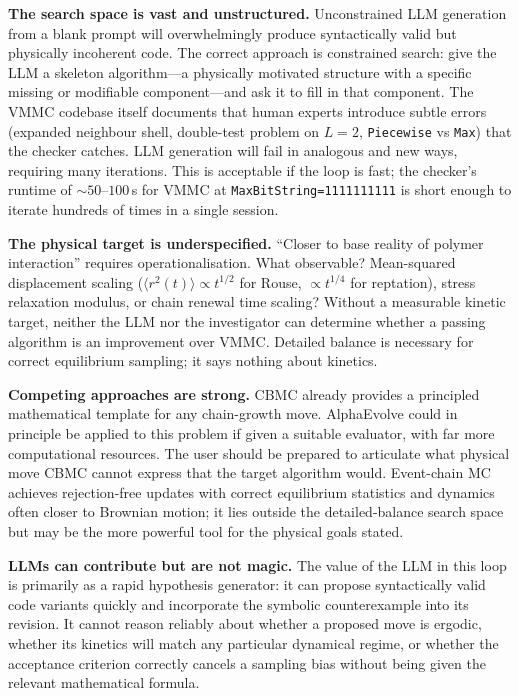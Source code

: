 \documentclass[10.5pt]{article}
\begin{document}
\textbf{The search space is vast and unstructured.}  Unconstrained LLM generation
from a blank prompt will overwhelmingly produce syntactically valid but physically
incoherent code.  The correct approach is constrained search: give the LLM a
skeleton algorithm---a physically motivated structure with a specific missing or
modifiable component---and ask it to fill in that component.  The VMMC codebase
itself documents that human experts introduce subtle errors (expanded neighbour
shell, double-test problem on $L=2$, \texttt{Piecewise} vs \texttt{Max}) that the
checker catches.  LLM generation will fail in analogous and new ways, requiring many
iterations.  This is acceptable if the loop is fast; the checker's runtime of
$\sim\!50$--$100$\,s for VMMC at \texttt{MaxBitString=1111111111} is
short enough to iterate hundreds of times in a single session.

\textbf{The physical target is underspecified.}  ``Closer to base reality of
polymer interaction'' requires operationalisation.  What observable?  Mean-squared
displacement scaling ($\langle r^2(t) \rangle \propto t^{1/2}$ for Rouse,
$\propto t^{1/4}$ for reptation), stress relaxation modulus, or chain renewal time
scaling?  Without a measurable kinetic target, neither the LLM nor the investigator
can determine whether a passing algorithm is an improvement over VMMC.  Detailed
balance is necessary for correct equilibrium sampling; it says nothing about
kinetics.

\textbf{Competing approaches are strong.}  CBMC already provides a principled
mathematical template for any chain-growth move.  AlphaEvolve could in principle be
applied to this problem if given a suitable evaluator, with far more computational
resources.  The user should be prepared to articulate what physical move CBMC cannot
express that the target algorithm would.  Event-chain MC \cite{ecmc2009} achieves
rejection-free updates with correct equilibrium statistics and dynamics often closer
to Brownian motion; it lies outside the detailed-balance search space but may be the
more powerful tool for the physical goals stated.

\textbf{LLMs can contribute but are not magic.}  The value of the LLM in this loop
is primarily as a rapid hypothesis generator: it can propose syntactically valid code
variants quickly and incorporate the symbolic counterexample into its revision.  It
cannot reason reliably about whether a proposed move is ergodic, whether its
kinetics will match any particular dynamical regime, or whether the acceptance
criterion correctly cancels a sampling bias without being given the relevant
mathematical formula.
\end{document}

